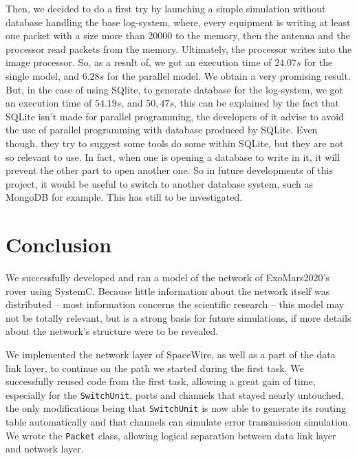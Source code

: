 \documentclass[12pt,a4paper]{article}
\begin{document}
\pagebreak

Then, we decided to do a first try by launching a simple simulation without database handling the base log-system, where, every equipment is writing at least one packet with a size more than 20000 to the memory, then the antenna and the processor read packets from the memory. Ultimately, the processor writes into the image processor. So, as a result of, we got an execution time of $24.07 s$ for the single model, and $6.28 s$ for the parallel model. We obtain a very promising result. But, in the case of using SQlite, to generate database for the log-system, we got an execution time of $54.19 s$, and $50,47 s$, this can be explained by the fact that SQLite isn't made for parallel programming, the developers of it advise to avoid the use of parallel programming with database produced by SQLite. Even though, they try to suggest some tools do some within SQLite, but they are not so relevant to use. In fact, when one is opening a database to write in it, it will prevent the other part to open another one. So in future developments of this project, it would be useful to switch to another database system, such as MongoDB for example. This has still to be investigated.

\pagebreak

\section{Conclusion}

We successfully developed and ran a model of the network of ExoMars2020's rover  using SystemC. Because little information about the network itself was distributed \--- most information concerns the scientific research \--- this model may not be totally relevant, but is a strong basis for future simulations, if more details about the network's structure were to be revealed.

We implemented the network layer of SpaceWire, as well as a part of the data link layer, to continue on the path we started during the first task. We successfully reused code from the first task, allowing a great gain of time, especially for the \texttt{SwitchUnit}, ports and channels that stayed nearly untouched, the only modifications being that \texttt{SwitchUnit} is now able to generate its routing table automatically and that channels can simulate error transmission simulation. We wrote the \texttt{Packet} class, allowing logical separation between data link layer and network layer.
\end{document}
